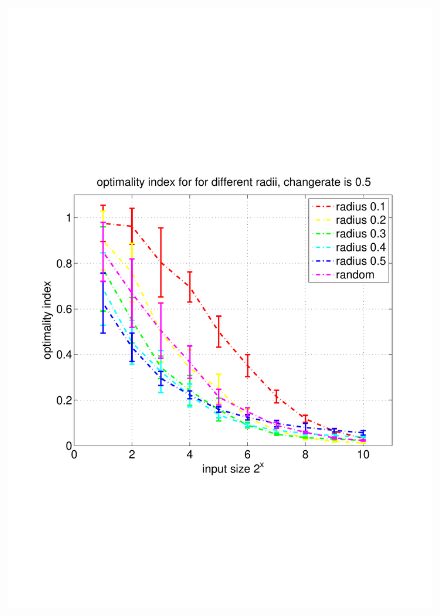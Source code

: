 \documentclass[11pt]{article}
\begin{document}
\begin{figure}
	\includegraphics[width=\linewidth]{../../code/data/2014_12_12_00_55_41/figure_2}
\end{figure}
\end{document}
